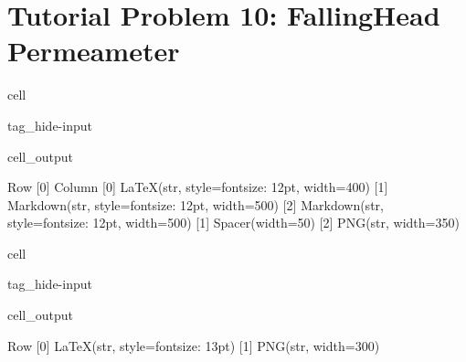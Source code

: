\documentclass[letterpaper,10pt,english]{jupyterBook}
\begin{document}
\section{Tutorial Problem 10: Falling\sphinxhyphen{}Head Permeameter}
\label{\detokenize{content/tutorials/T3/tutorial_03:tutorial-problem-10-falling-head-permeameter}}
\begin{sphinxuseclass}{cell}
\begin{sphinxuseclass}{tag_hide-input}\begin{sphinxVerbatimOutput}

\begin{sphinxuseclass}{cell_output}
\begin{sphinxVerbatim}[commandchars=\\\{\}]
Row
    [0] Column
        [0] LaTeX(str, style=\PYGZob{}\PYGZsq{}font\PYGZhy{}size\PYGZsq{}: \PYGZsq{}12pt\PYGZsq{}\PYGZcb{}, width=400)
        [1] Markdown(str, style=\PYGZob{}\PYGZsq{}font\PYGZhy{}size\PYGZsq{}: \PYGZsq{}12pt\PYGZsq{}\PYGZcb{}, width=500)
        [2] Markdown(str, style=\PYGZob{}\PYGZsq{}font\PYGZhy{}size\PYGZsq{}: \PYGZsq{}12pt\PYGZsq{}\PYGZcb{}, width=500)
    [1] Spacer(width=50)
    [2] PNG(str, width=350)
\end{sphinxVerbatim}

\end{sphinxuseclass}\end{sphinxVerbatimOutput}

\end{sphinxuseclass}
\end{sphinxuseclass}
\begin{sphinxuseclass}{cell}
\begin{sphinxuseclass}{tag_hide-input}\begin{sphinxVerbatimOutput}

\begin{sphinxuseclass}{cell_output}
\begin{sphinxVerbatim}[commandchars=\\\{\}]
Row
    [0] LaTeX(str, style=\PYGZob{}\PYGZsq{}font\PYGZhy{}size\PYGZsq{}: \PYGZsq{}13pt\PYGZsq{}\PYGZcb{})
    [1] PNG(str, width=300)
\end{sphinxVerbatim}

\end{sphinxuseclass}\end{sphinxVerbatimOutput}

\end{sphinxuseclass}
\end{sphinxuseclass}
\end{document}
